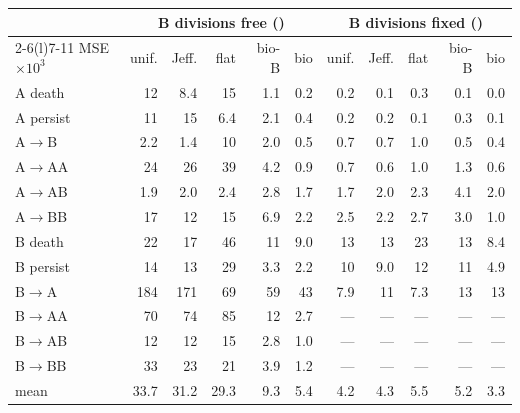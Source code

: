 \documentclass[10pt,a4paper]{article}
\newcommand{\code}[1]{\texttt{\detokenize{#1}}}
\begin{document}
\begin{center}\scriptsize
\setlength{\tabcolsep}{3.2pt}
\begin{tabular}{@{}lrrrrr@{\hspace{8pt}}rrrrr@{}}\toprule
 & \multicolumn{5}{c}{B divisions free (\code{two_type})} & \multicolumn{5}{c}{B divisions fixed (\code{reversible_ab})} \\\cmidrule(lr){2-6}\cmidrule(l){7-11}
MSE $\times 10^{3}$ & unif. & Jeff. & flat & bio-B & bio & unif. & Jeff. & flat & bio-B & bio \\\midrule
A death & 12 & 8.4 & 15 & 1.1 & 0.2 & 0.2 & 0.1 & 0.3 & 0.1 & 0.0 \\
A persist & 11 & 15 & 6.4 & 2.1 & 0.4 & 0.2 & 0.2 & 0.1 & 0.3 & 0.1 \\
A$\to$B & 2.2 & 1.4 & 10 & 2.0 & 0.5 & 0.7 & 0.7 & 1.0 & 0.5 & 0.4 \\
A$\to$AA & 24 & 26 & 39 & 4.2 & 0.9 & 0.7 & 0.6 & 1.0 & 1.3 & 0.6 \\
A$\to$AB & 1.9 & 2.0 & 2.4 & 2.8 & 1.7 & 1.7 & 2.0 & 2.3 & 4.1 & 2.0 \\
A$\to$BB & 17 & 12 & 15 & 6.9 & 2.2 & 2.5 & 2.2 & 2.7 & 3.0 & 1.0 \\
B death & 22 & 17 & 46 & 11 & 9.0 & 13 & 13 & 23 & 13 & 8.4 \\
B persist & 14 & 13 & 29 & 3.3 & 2.2 & 10 & 9.0 & 12 & 11 & 4.9 \\
B$\to$A & 184 & 171 & 69 & 59 & 43 & 7.9 & 11 & 7.3 & 13 & 13 \\
B$\to$AA & 70 & 74 & 85 & 12 & 2.7 & --- & --- & --- & --- & --- \\
B$\to$AB & 12 & 12 & 15 & 2.8 & 1.0 & --- & --- & --- & --- & --- \\
B$\to$BB & 33 & 23 & 21 & 3.9 & 1.2 & --- & --- & --- & --- & --- \\\midrule
mean & 33.7 & 31.2 & 29.3 & 9.3 & 5.4 & 4.2 & 4.3 & 5.5 & 5.2 & 3.3 \\\bottomrule
\end{tabular}


\end{center}
\end{document}
